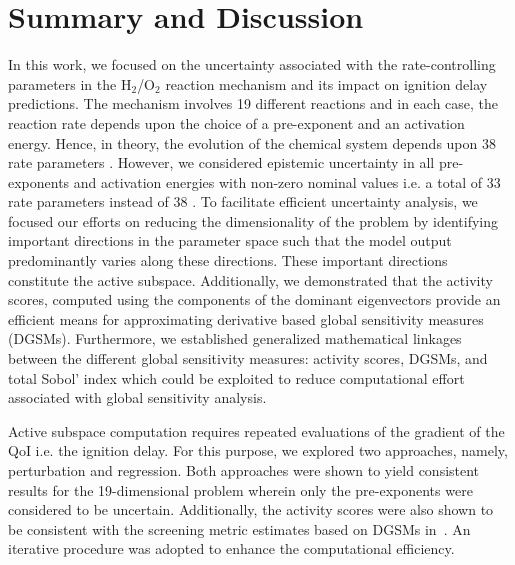 \section{Summary and Discussion}
\label{sec:conc}
 
In this work, we focused on the uncertainty associated with the
rate-controlling parameters in the H$_2$/O$_2$ reaction mechanism
 and its
impact on ignition delay predictions. The mechanism involves 19 different
reactions and in each case, the reaction rate depends upon the choice of a
pre-exponent and an activation energy. Hence, in theory, the evolution of the
chemical system depends upon 38 rate parameters .
However, we considered 
epistemic uncertainty in all pre-exponents and activation energies with non-zero
nominal values i.e. a total of 33 rate parameters instead of 38 .  
To facilitate efficient uncertainty analysis, we focused our efforts on
reducing the dimensionality of the problem by identifying important directions
in the parameter space such that the model output 
predominantly varies along these directions. These important directions
constitute the active subspace. Additionally, we demonstrated that the activity scores,
computed using the components of the dominant eigenvectors provide an efficient
means for approximating derivative based global sensitivity measures (DGSMs).
Furthermore, we established generalized mathematical linkages between the
different global sensitivity measures: activity scores, DGSMs, and total Sobol'
index which could be exploited to reduce computational effort associated with
global sensitivity analysis. 
 
Active subspace computation requires repeated evaluations of the gradient of
the QoI i.e. the ignition delay. For this purpose, we explored two approaches,
namely, perturbation and regression. Both approaches were shown to yield
consistent results for the 19-dimensional problem wherein only the
pre-exponents were considered to be uncertain.   Additionally, the activity scores were also
shown to be consistent with the screening metric estimates based on DGSMs
in~\cite{Vohra:2018}. An iterative procedure was adopted to enhance the
computational efficiency. 

